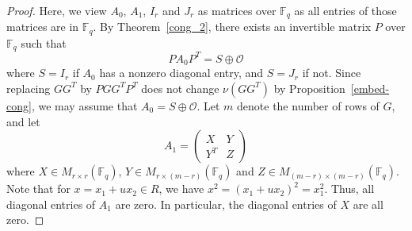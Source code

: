 \documentclass{article}
\theoremstyle{definition}
\theoremstyle{remark}
\begin{document}
\begin{proof}
    Here, we view $A_0$, $A_1$, $I_r$ and $J_r$ as matrices over $\mathbb{F}_q$ as all entries of those matrices are in $\mathbb{F}_q$. By Theorem~\ref{cong_2}, there exists an invertible matrix $P$ over $\mathbb{F}_q$ such that
    \[
    P A_0P^T=S\oplus\mathcal{O}
    \]
    where $S=I_r$ if $A_0$ has a nonzero diagonal entry, and $S=J_r$ if not. Since replacing $GG^T$ by $PGG^TP^T$ does not change $\nu(GG^T)$ by Proposition~\ref{embed-cong}, we may assume that $A_0=S\oplus \mathcal{O}$. Let $m$ denote the number of rows of $G$, and let
    \[
    A_1=\begin{pmatrix}
        X & Y\\Y^T & Z
    \end{pmatrix}
    \]
    where $X\in M_{r\times r}(\mathbb{F}_q)$, $Y\in M_{r\times (m-r)}(\mathbb{F}_q)$ and $Z\in M_{(m-r)\times (m-r)}(\mathbb{F}_q)$. Note that for $x=x_1+ux_2\in R$, we have $x^2=(x_1+ux_2)^2=x_1^2$. Thus, all diagonal entries of $A_1$ are zero. In particular, the diagonal entries of $X$ are all zero. 
    

\end{proof}
\end{document}
